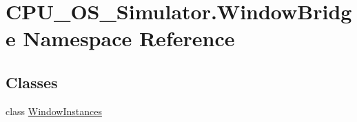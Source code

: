 \hypertarget{namespace_c_p_u___o_s___simulator_1_1_window_bridge}{}\section{C\+P\+U\+\_\+\+O\+S\+\_\+\+Simulator.\+Window\+Bridge Namespace Reference}
\label{namespace_c_p_u___o_s___simulator_1_1_window_bridge}
\subsection*{Classes}
\begin{DoxyCompactItemize}
\item 
class \hyperlink{class_c_p_u___o_s___simulator_1_1_window_bridge_1_1_window_instances}{Window\+Instances}
\end{DoxyCompactItemize}
